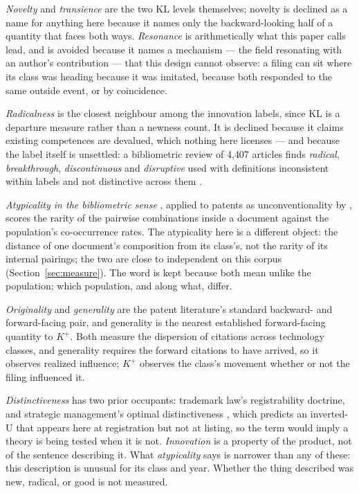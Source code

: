 \emph{Novelty} and \emph{transience} are the two KL levels themselves;
novelty is declined as a name for anything here because it names only the
backward-looking half of a quantity that faces both ways.
\emph{Resonance} is arithmetically what this paper calls lead, and is
avoided because it names a mechanism --- the field resonating with an
author's contribution --- that this design cannot observe: a filing can
sit where its class was heading because it was imitated, because both
responded to the same outside event, or by coincidence.

\emph{Radicalness} is the closest neighbour among the innovation labels,
since KL is a departure measure rather than a newness count. It is
declined because it claims existing competences are devalued, which
nothing here licenses --- and because the label itself is unsettled: a
bibliometric review of 4{,}407 articles finds \emph{radical},
\emph{breakthrough}, \emph{discontinuous} and \emph{disruptive} used with
definitions inconsistent within labels and not distinctive across them
\citep{Verhoeven2025}.

\emph{Atypicality in the bibliometric sense} \citep{Uzzi2013}, applied to
patents as unconventionality by \citet{BerkesGaetani2021}, scores the
rarity of the pairwise combinations inside a document against the
population's co-occurrence rates. The atypicality here is a different
object: the distance of one document's composition from its class's, not
the rarity of its internal pairings; the two are close to independent on
this corpus (Section~\ref{sec:measure}). The word is kept because both
mean unlike the population; which population, and along what, differ.

\emph{Originality} and \emph{generality} \citep{HallJaffe2001} are the
patent literature's standard backward- and forward-facing pair, and
generality is the nearest established forward-facing quantity to $K^+$.
Both measure the dispersion of citations across technology classes,
and generality requires the forward citations to have arrived, so it
observes realized influence; $K^+$ observes the class's movement whether
or not the filing influenced it.

\emph{Distinctiveness} has two prior occupants: trademark law's
registrability doctrine, and strategic management's optimal
distinctiveness \citep{Zhao2017}, which predicts an inverted-U that
appears here at registration but not at listing, so the term would imply
a theory is being tested when it is not. \emph{Innovation} is a property
of the product, not of the sentence describing it. What
\emph{atypicality} says is narrower than any of these: this description
is unusual for its class and year. Whether the thing described was new,
radical, or good is not measured.
